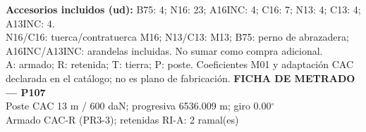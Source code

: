 \begingroup\scriptsize
\textbf{Accesorios incluidos (ud):} B75: 4; N16: 23; A16INC: 4; C16: 7; N13: 4; C13: 4; A13INC: 4.\\
N16/C16: tuerca/contratuerca M16; N13/C13: M13; B75: perno de abrazadera; A16INC/A13INC: arandelas incluidas. No sumar como compra adicional.\\
A: armado; R: retenida; T: tierra; P: poste. Coeficientes M01 y adaptación CAC declarada en el catálogo; no es plano de fabricación.
\endgroup\endgroup
\clearpage{}
\begingroup\small\setlength{\parskip}{3pt}\renewcommand{\arraystretch}{1.05}
\textbf{\large FICHA DE METRADO — P107}\\[4pt]
Poste CAC 13 m / 600 daN; progresiva 6536.009 m; giro 0.00\ensuremath{^\circ}\\
Armado CAC-R (PR3-3); retenidas RI-A: 2 ramal(es)\\
\begingroup\scriptsize
